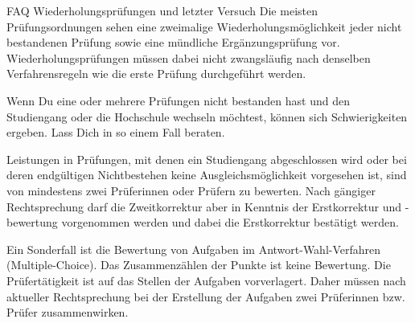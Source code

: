 \begin{artikel}{FAQ Wiederholungsprüfungen und letzter Versuch}
Die meisten Prüfungsordnungen sehen eine zweimalige Wiederholungsmöglichkeit jeder nicht bestandenen Prüfung sowie eine mündliche Ergänzungsprüfung vor. Wiederholungsprüfungen müssen dabei nicht zwangsläufig nach denselben Verfahrensregeln wie die erste Prüfung durchgeführt werden.

Wenn Du eine oder mehrere Prüfungen nicht bestanden hast und den Studiengang oder die Hochschule wechseln möchtest, können sich Schwierigkeiten ergeben. Lass Dich in so einem Fall beraten.

Leistungen in Prüfungen, mit denen ein Studiengang abgeschlossen wird oder bei deren endgültigen Nichtbestehen keine Ausgleichsmöglichkeit vorgesehen ist, sind von mindestens zwei Prüferinnen oder Prüfern zu bewerten. Nach gängiger Rechtsprechung darf die Zweitkorrektur aber in Kenntnis der Erstkorrektur und -bewertung vorgenommen werden und dabei die Erstkorrektur bestätigt werden.

Ein Sonderfall ist die Bewertung von Aufgaben im Antwort-Wahl-Verfahren (Multiple-Choice). Das Zusammenzählen der Punkte ist keine Bewertung. Die Prüfertätigkeit ist auf das Stellen der Aufgaben vorverlagert. Daher müssen nach aktueller Rechtsprechung bei der Erstellung der Aufgaben zwei Prüferinnen bzw. Prüfer zusammenwirken.
\end{artikel}
